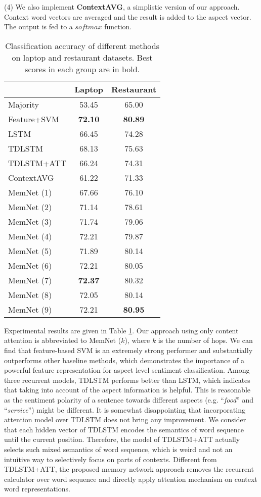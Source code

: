 \documentclass[11pt,letterpaper]{article}
\begin{document}
(4) We also implement \textbf{ContextAVG}, a simplistic version of our approach. Context word vectors are averaged and the result is added to the aspect vector. 
The output is fed to a $softmax$ function.


\begin{table}[h]
	\centering
	\begin{tabular}{l|c|c}
		\hline
		& {Laptop} & {Restaurant} \\
		\hline
		Majority 				& 53.45	& 65.00 \\
		Feature+SVM				& \textbf{72.10}	& \textbf{80.89} \\
		LSTM					& 66.45 & 74.28 \\
		TDLSTM					& 68.13 & 75.63 \\
		TDLSTM+ATT				& 66.24 & 74.31 \\
		ContextAVG				& 61.22	& 71.33	\\
		\hline
		MemNet (1)				& 67.66 & 76.10 \\
		MemNet (2)				& 71.14 & 78.61 \\
		MemNet (3)				& 71.74 & 79.06 \\
		MemNet (4)				& 72.21 & 79.87 \\
		MemNet (5)				& 71.89 & 80.14 \\
		MemNet (6)				& 72.21 & 80.05 \\
		MemNet (7)				& \textbf{72.37} & 80.32 \\
		MemNet (8)				& 72.05 & 80.14 \\
		MemNet (9)				& 72.21 & \textbf{80.95} \\
		\hline
	\end{tabular}	
	\caption{Classification accuracy of different methods on laptop and restaurant datasets. Best scores in each group are in bold.}
	\label{table:experiment-baseline}
\end{table}

Experimental results are given in Table \ref{table:experiment-baseline}. 
Our approach using only content attention is abbreviated to MemNet ($k$), where $k$ is the number of hops. 
We can find that feature-based SVM is an extremely strong performer and substantially outperforms other baseline methods, which demonstrates the importance of a powerful feature representation for aspect level sentiment classification. 
Among three recurrent models, TDLSTM performs better than LSTM, which indicates that taking into account of the aspect information is helpful. 
This is reasonable as the sentiment polarity of a sentence towards different aspects (e.g. ``\textit{food}'' and ``\textit{service}'') might be different. 
It is somewhat disappointing that incorporating attention model over TDLSTM does not bring any improvement. 
We consider that each hidden vector of TDLSTM encodes the semantics of word sequence until the current position. Therefore, the model of TDLSTM+ATT actually selects such mixed semantics of word sequence, which is weird and not an intuitive way to selectively focus on parts of contexts. 
Different from TDLSTM+ATT, the proposed memory network approach removes the recurrent calculator over word sequence and directly apply attention mechanism on context word representations.
\end{document}
